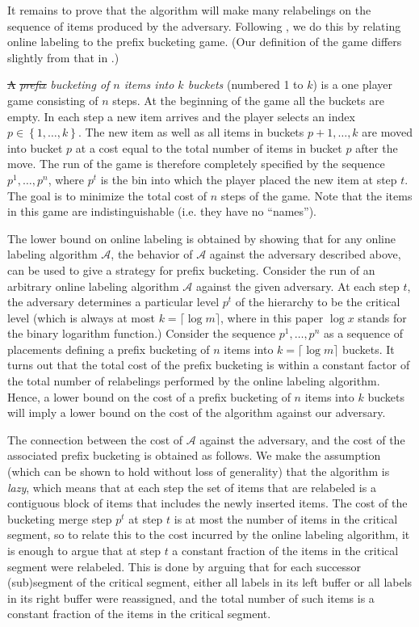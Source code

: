 \documentclass[unicode,review]{siamart1116}
\newcommand{\A}{\mathcal{A}}
\newcommand{\natInt}[2]{ \left\{ #1, \dotsc, #2 \right\} }
\numberwithin{theorem}{section}
\providecommand{\DIFadd}[1]{{\protect\color{blue}\uwave{#1}}} %
\providecommand{\DIFdel}[1]{{\protect\color{red}\sout{#1}}}                      %
\providecommand{\DIFaddbegin}{} %
\providecommand{\DIFaddend}{} %
\providecommand{\DIFdelbegin}{} %
\providecommand{\DIFdelend}{} %
\newcommand{\DIFscaledelfig}{0.5}
\newlength{\DIFdelgraphicswidth} %
\newlength{\DIFdelgraphicsheight} %
\newcommand{\DIFaddincludegraphics}[2][]{{\color{blue}\fbox{\DIFOincludegraphics[#1]{#2}}}} %
\newcommand{\DIFdelincludegraphics}[2][]{%
\sbox{\DIFdelgraphicsbox}{\DIFOincludegraphics[#1]{#2}}%
\settoboxwidth{\DIFdelgraphicswidth}{\DIFdelgraphicsbox} %
\settoboxtotalheight{\DIFdelgraphicsheight}{\DIFdelgraphicsbox} %
\scalebox{\DIFscaledelfig}{%
\parbox[b]{\DIFdelgraphicswidth}{\usebox{\DIFdelgraphicsbox}\\[-\baselineskip] \rule{\DIFdelgraphicswidth}{0em}}\llap{\resizebox{\DIFdelgraphicswidth}{\DIFdelgraphicsheight}{%
\setlength{\unitlength}{\DIFdelgraphicswidth}%
\begin{picture}(1,1)%
\thicklines\linethickness{2pt} %
{\color[rgb]{1,0,0}\put(0,0){\framebox(1,1){}}}%
{\color[rgb]{1,0,0}\put(0,0){\line( 1,1){1}}}%
{\color[rgb]{1,0,0}\put(0,1){\line(1,-1){1}}}%
\end{picture}%
}\hspace*{3pt}}} %
} %
\DeclareRobustCommand{\DIFaddbegin}{\DIFOaddbegin \let\includegraphics\DIFaddincludegraphics} %
\DeclareRobustCommand{\DIFaddend}{\DIFOaddend \let\includegraphics\DIFOincludegraphics} %
\DeclareRobustCommand{\DIFdelbegin}{\DIFOdelbegin \let\includegraphics\DIFdelincludegraphics} %
\DeclareRobustCommand{\DIFdelend}{\DIFOaddend \let\includegraphics\DIFOincludegraphics} %
\begin{document}
It remains to prove that the algorithm will make many relabelings on the sequence
of items produced by the adversary.  Following  \cite{DSZ04}, we 
do this by relating online labeling to the prefix bucketing game.
(Our definition of the game differs slightly from that in \cite{DSZ04}.)

\DIFdelbegin \DIFdel{A }\DIFdelend \emph{\DIFdelbegin \DIFdel{prefix }\DIFdelend \DIFaddbegin \DIFadd{Prefix }\DIFaddend bucketing of $n$ items into $k$ buckets} (numbered 1 to $k$) is a one player game consisting of $n$ steps.
At the beginning of the game
all the buckets are empty. In each step a new item arrives and the player selects an index $p \in \natInt{1}{k}$.
The new item as well as all items in buckets $p+1,\dotsc,k$ are moved into bucket $p$ at a cost equal to the
total number of items in bucket $p$ after the move.   The run of the game is therefore completely specified by
the sequence $p^1,\ldots,p^n$, where $p^t$ is the bin into which the player placed the new item at step $t$. 
The goal is to minimize the total cost of $n$ steps
of the game.   
Note that the items in this game are indistinguishable (i.e. they have no ``names'').

The lower bound on online labeling is obtained by showing that for any online
labeling algorithm $\A$, the behavior of $\A$ against the adversary described above, can be used to
give a strategy for prefix bucketing.
Consider the run of an arbitrary online labeling algorithm $\A$
against the given adversary.  At each step $t$, the adversary determines a particular
level $p^t$ of the hierarchy to be the critical level (which is always at most $k=\lceil \log m \rceil$,
where in this paper $\log x$ stands for the binary logarithm function.)
 Consider the sequence $p^1,\ldots,p^n$ as a  sequence of placements defining a prefix bucketing
of $n$ items into $k=\lceil \log m \rceil$ buckets. It turns out that
the total cost of the prefix bucketing is within a constant factor of  the total number of relabelings
performed by the online labeling algorithm. Hence, a lower bound on the cost of a prefix bucketing of $n$ items into $k$
buckets will imply a lower bound on the cost of the algorithm against our adversary.

The connection between the cost of $\A$ against the adversary, and the cost of the associated
prefix bucketing is obtained as follows.
We  make the assumption (which can be shown to hold without loss of generality) that the algorithm is \emph{lazy}, which means
that at each  step the set of items that are relabeled is a contiguous block of items that includes
the newly inserted items.    The cost of the bucketing merge step $p^t$ at step $t$ 
is at most the number of items in
the critical segment, so to relate this to the cost incurred by the online labeling algorithm, it is enough
to argue that at step $t$ a constant fraction of the items in the critical segment were relabeled.  This is done
by arguing that  for each successor (sub)segment of the critical segment, either all labels in its left buffer
or all labels in its right buffer were reassigned, and the total number of such items is a constant fraction of the items
in the critical segment.
\end{document}
